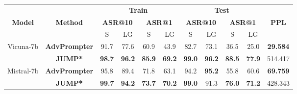 \renewcommand{\arraystretch}{1.5}
\setlength{\tabcolsep}{5pt} %
\captionsetup[table]{justification=raggedright, singlelinecheck=false}
\begin{table*}[!t]
    \centering
    \small
    \begin{tabular}{ccccccccccc}  %
        \hline
         &  & \multicolumn{4}{c}{\textbf{Train}} & \multicolumn{4}{c}{\textbf{Test}} & \textbf{} \\
        \cline{3-6} \cline{7-10} 
        \textbf{Model} & \textbf{Method} & \multicolumn{2}{c}{\textbf{ASR@10}} & \multicolumn{2}{c}{\textbf{ASR@1}} & \multicolumn{2}{c}{\textbf{ASR@10}} & \multicolumn{2}{c}{\textbf{ASR@1}} & \textbf{PPL} \\
        \cline{3-4} \cline{5-6} \cline{7-8} \cline{9-10} 
         &  & S & LG & S & LG & S & LG & S & LG &  \\
        \hline
        \multirow{2}{*}{Vicuna-7b} & \textbf{AdvPrompter} & 91.7 & 77.6 & 60.9 & 43.9 & 82.7 & 73.1 & 36.5 & 25.0 & \textbf{29.584} \\ %
            & \textbf{JUMP*} & \textbf{98.7} & \textbf{96.2} & \textbf{85.9} & \textbf{69.2} & \textbf{99.0} & \textbf{96.2} & \textbf{88.5} & \textbf{77.9} & 514.417 \\
        \hline
        \multirow{2}{*}{Mistral-7b} & \textbf{AdvPrompter} & 95.8 & 89.4  & 71.8 & 63.1 & 94.2 & \textbf{95.2} & 55.8 & 60.6 & \textbf{69.759} \\ %
            & \textbf{JUMP*} & \textbf{99.7} & \textbf{94.2} & \textbf{73.7} & \textbf{70.2} & \textbf{99.0} & 91.3 & \textbf{76.0} & \textbf{71.2} & 428.343 \\

\end{tabular}
\end{table*}
